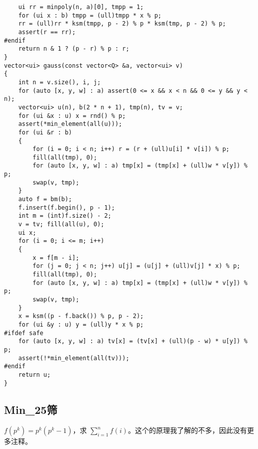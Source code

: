 \documentclass[12pt]{ctexart}
\begin{document}
\begin{lstlisting}
	ui rr = minpoly(n, a)[0], tmpp = 1;
	for (ui x : b) tmpp = (ull)tmpp * x % p;
	rr = (ull)rr * ksm(tmpp, p - 2) % p * ksm(tmp, p - 2) % p;
	assert(r == rr);
#endif
	return n & 1 ? (p - r) % p : r;
}
vector<ui> gauss(const vector<Q> &a, vector<ui> v)
{
	int n = v.size(), i, j;
	for (auto [x, y, w] : a) assert(0 <= x && x < n && 0 <= y && y < n);
	vector<ui> u(n), b(2 * n + 1), tmp(n), tv = v;
	for (ui &x : u) x = rnd() % p;
	assert(*min_element(all(u)));
	for (ui &r : b)
	{
		for (i = 0; i < n; i++) r = (r + (ull)u[i] * v[i]) % p;
		fill(all(tmp), 0);
		for (auto [x, y, w] : a) tmp[x] = (tmp[x] + (ull)w * v[y]) % p;
		swap(v, tmp);
	}
	auto f = bm(b);
	f.insert(f.begin(), p - 1);
	int m = (int)f.size() - 2;
	v = tv; fill(all(u), 0);
	ui x;
	for (i = 0; i <= m; i++)
	{
		x = f[m - i];
		for (j = 0; j < n; j++) u[j] = (u[j] + (ull)v[j] * x) % p;
		fill(all(tmp), 0);
		for (auto [x, y, w] : a) tmp[x] = (tmp[x] + (ull)w * v[y]) % p;
		swap(v, tmp);
	}
	x = ksm((p - f.back()) % p, p - 2);
	for (ui &y : u) y = (ull)y * x % p;
#ifdef safe
	for (auto [x, y, w] : a) tv[x] = (tv[x] + (ull)(p - w) * u[y]) % p;
	assert(!*min_element(all(tv)));
#endif
	return u;
}
\end{lstlisting}



\subsection{Min\_25筛}

$f(p^k)=p^k(p^k-1)$，求 $\sum\limits_{i=1}^n f(i)$。这个的原理我了解的不多，因此没有更多注释。
\end{document}
